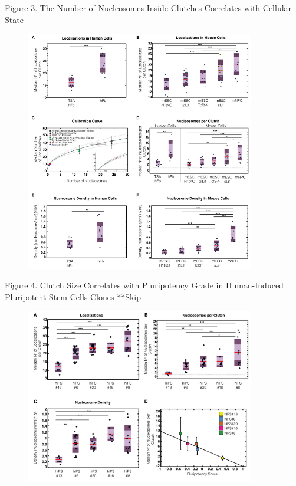 \documentclass{beamer}			%
\begin{document}
\begin{frame}{Figure 3. The Number of Nucleosomes Inside Clutches Correlates with Cellular State}
\begin{figure}
\includegraphics[width=10cm]{Figure-3.png}
\end{figure}
\end{frame}

\begin{frame}{Figure 4. Clutch Size Correlates with Pluripotency Grade in Human-Induced Pluripotent Stem Cells Clones}
**Skip
\begin{figure}
\includegraphics[width=10cm]{Figure-4.png}
\end{figure}
\end{frame}
\end{document}

